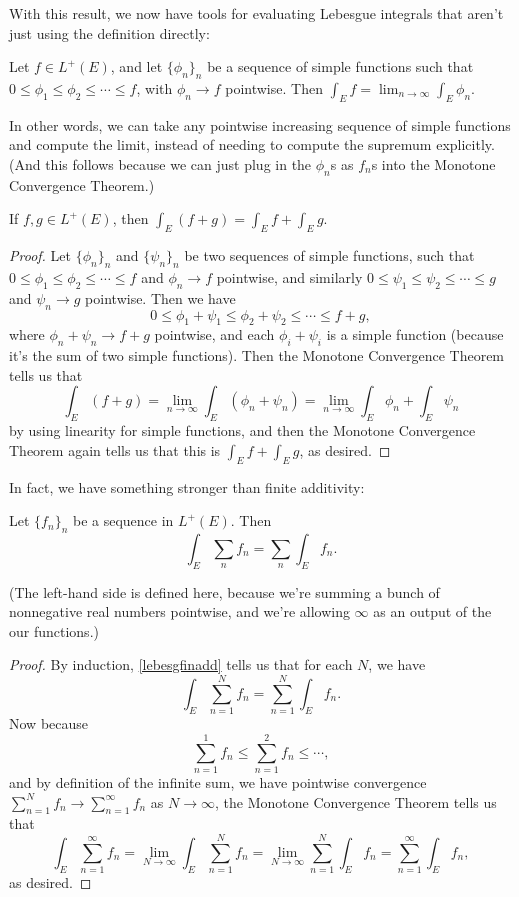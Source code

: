 With this result, we now have tools for evaluating Lebesgue integrals that aren't just using the definition directly:

\begin{corollary}
Let $f\in L^+(E)$, and let $\{\phi_n\}_n$ be a sequence of simple functions such that $0 \le \phi_1 \le \phi_2 \le \cdots \le f$, with $\phi_n \to f$ pointwise. Then $\int_E f = \lim_{n \to \infty} \int_E \phi_n$. 
\end{corollary}

In other words, we can take any pointwise increasing sequence of simple functions and compute the limit, instead of needing to compute the supremum explicitly. (And this follows because we can just plug in the $\phi_n$s as $f_n$s into the Monotone Convergence Theorem.)


\begin{corollary}\label{lebesgfinadd}
If $f, g \in L^+(E)$, then $\int_E (f+g) = \int_E f + \int_E g$.
\end{corollary}
\begin{proof}
Let $\{\phi_n\}_n$ and $\{\psi_n\}_n$ be two sequences of simple functions, such that $0 \le \phi_1 \le \phi_2 \le \cdots \le f$ and $\phi_n \to f$ pointwise, and similarly $0 \le \psi_1 \le \psi_2 \le \cdots \le g$ and $\psi_n \to g$ pointwise. Then we have 
\[
    0 \le \phi_1 + \psi_1 \le \phi_2 + \psi_2 \le \cdots \le f + g,
\]
where $\phi_n + \psi_n \to f + g$ pointwise, and each $\phi_i + \psi_i$ is a simple function (because it's the sum of two simple functions). Then the Monotone Convergence Theorem tells us that 
\[
    \int_E (f+g) = \lim_{n \to \infty} \int_E (\phi_n + \psi_n) = \lim_{n \to \infty} \int_E \phi_n + \int_E \psi_n
\]
by using linearity for simple functions, and then the Monotone Convergence Theorem again tells us that this is $\int_E f + \int_E g$, as desired.
\end{proof}

In fact, we have something stronger than finite additivity:

\begin{theorem}
Let $\{f_n\}_n$ be a sequence in $L^+(E)$. Then
\[
    \int_E \sum_n f_n = \sum_n \int_E f_n.
\]
\end{theorem}

(The left-hand side is defined here, because we're summing a bunch of nonnegative real numbers pointwise, and we're allowing $\infty$ as an output of the our functions.)

\begin{proof}
By induction, \cref{lebesgfinadd} tells us that for each $N$, we have
\[
    \int_E \sum_{n=1}^N f_n = \sum_{n=1}^N \int_E f_n.
\]
Now because 
\[
    \sum_{n=1}^1 f_n \le \sum_{n=1}^2 f_n \le \cdots,
\]
and by definition of the infinite sum, we have pointwise convergence $\sum_{n=1}^N f_n \to \sum_{n=1}^{\infty} f_n$ as $N \to \infty$, the Monotone Convergence Theorem tells us that 
\[
    \int_E \sum_{n=1}^{\infty} f_n = \lim_{N \to \infty} \int_E \sum_{n=1}^N f_n = \lim_{N \to \infty} \sum_{n=1}^N \int_E f_n = \sum_{n=1}^{\infty} \int_E f_n,
\]
as desired.
\end{proof}

